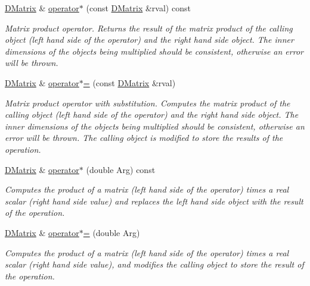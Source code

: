 \begin{DoxyCompactItemize}
\hyperlink{classDMatrix}{DMatrix} \& \hyperlink{classDMatrix_a17a7fbea90ec8a16e4ced726128d4b5f}{operator$\ast$} (const \hyperlink{classDMatrix}{DMatrix} \&rval) const 
\begin{DoxyCompactList}\small\item\em Matrix product operator. Returns the result of the matrix product of the calling object (left hand side of the operator) and the right hand side object. The inner dimensions of the objects being multiplied should be consistent, otherwise an error will be thrown. \item\end{DoxyCompactList}\item 
\hyperlink{classDMatrix}{DMatrix} \& \hyperlink{classDMatrix_abda7d982b252b058549dbe48ec1276ba}{operator$\ast$=} (const \hyperlink{classDMatrix}{DMatrix} \&rval)
\begin{DoxyCompactList}\small\item\em Matrix product operator with substitution. Computes the matrix product of the calling object (left hand side of the operator) and the right hand side object. The inner dimensions of the objects being multiplied should be consistent, otherwise an error will be thrown. The calling object is modified to store the results of the operation. \item\end{DoxyCompactList}\item 
\hyperlink{classDMatrix}{DMatrix} \& \hyperlink{classDMatrix_a671296ddd1c619d1ee31a308ac56840c}{operator$\ast$} (double Arg) const 
\begin{DoxyCompactList}\small\item\em Computes the product of a matrix (left hand side of the operator) times a real scalar (right hand side value) and replaces the left hand side object with the result of the operation. \item\end{DoxyCompactList}\item 
\hyperlink{classDMatrix}{DMatrix} \& \hyperlink{classDMatrix_afe1c2b5daad8e441bb1da8edeccbe6a2}{operator$\ast$=} (double Arg)
\begin{DoxyCompactList}\small\item\em Computes the product of a matrix (left hand side of the operator) times a real scalar (right hand side value), and modifies the calling object to store the result of the operation. \item\end{DoxyCompactList}\item 

\end{DoxyCompactItemize}
